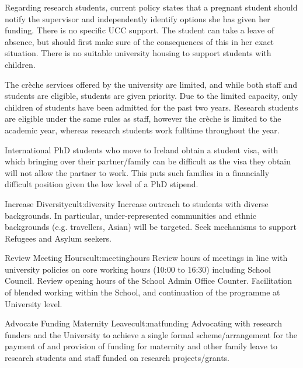 Regarding research students, current policy states that a pregnant student should notify the supervisor and independently identify options she has given her funding. There is no specific UCC support. %
The student can take a leave of absence, but should first make sure of the consequences of this in her exact situation. There is no suitable university housing to support students with children.  

The cr\`{e}che services offered by the university are limited, and while both staff and students are eligible, students are given priority. Due to the limited capacity,  only children of students have been admitted for the past two years. Research students are eligible under the same rules as staff, however the cr\`{e}che is limited to the academic year, whereas research students work fulltime throughout the year.

International PhD students who move to Ireland obtain a student visa, with which bringing over their partner/family can be difficult as the visa they obtain will not allow the partner to work. This puts such families in a financially difficult position given the low level of a PhD stipend. 





\newcommand{\actcultdiversity}{Increase outreach to students with diverse backgrounds. In particular, under-represented communities and ethnic backgrounds (e.g. travellers, Asian) will be targeted. Seek mechanisms to support Refugees and Asylum seekers.}
\begin{actionblock}{\ksspace{}Increase Diversity}{cult:diversity}
\actcultdiversity
\hfill{
    \hypersetup{hidelinks}
    \hyperlink{e1}{\gotoactionsymbol{}}
}
\end{actionblock}


\newcommand{\actcultmeetinghours}{Review hours of meetings in line with university policies on core working hours (10:00 to 16:30) including School Council. Review opening hours of the School Admin Office Counter. Facilitation of blended working within the School, and continuation of the programme at University level.}
\begin{actionblock}{\ksspace{}Review Meeting Hours}{cult:meetinghours}
\actcultmeetinghours
\hfill{
    \hypersetup{hidelinks}
    \hyperlink{e2}{\gotoactionsymbol{}}
}
\end{actionblock}





\newcommand{\actcultmatfunding}{Advocating with research funders and the University to achieve a single formal scheme/arrangement for the payment of and provision of funding for maternity and other family leave to research students and staff funded on research projects/grants.}
\begin{actionblock}{\ksspace{}Advocate Funding Maternity Leave}{cult:matfunding}
\actcultmatfunding
\hfill{
    \hypersetup{hidelinks}
    \hyperlink{e5}{\gotoactionsymbol{}}
}
\end{actionblock}

